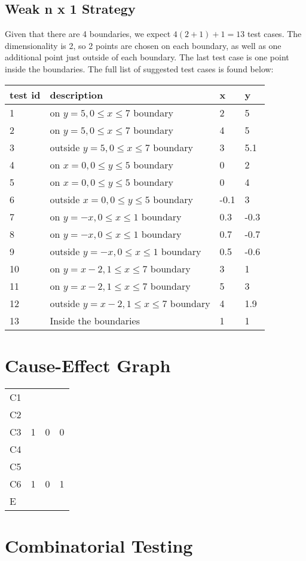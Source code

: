 \documentclass[letterpaper]{article}
\begin{document}
\subsection{Weak n x 1 Strategy}
Given that there are 4 boundaries, we expect $4(2+1) +1 = 13$ test cases. 
The dimensionality is 2, so 2 points are chosen on each boundary, as well
as one additional point just outside of each boundary. The last test case
is one point inside the boundaries. The full list of suggested test cases
is found below: 
\begin{adjustbox}{center}
	\begin{tabular}{llll}
		test id & description 			        & x & y    \\ \hline
		1       & on $y=5, 0\leq x\leq 7$ boundary      & 2 & 5    \\
		2       & on $y=5, 0\leq x\leq 7$ boundary      & 4 & 5    \\
		3       & outside $y=5, 0\leq x\leq 7$ boundary & 3 & 5.1 \\
		4 & on $x=0, 0\leq y \leq 5$ boundary           & 0 & 2 \\
		5 & on $x=0, 0\leq y \leq 5$ boundary           & 0 & 4 \\
		6 & outside $x=0, 0\leq y \leq 5$ boundary      & -0.1 & 3 \\
		7 & on $y=-x, 0\leq x\leq 1$ boundary           & 0.3 & -0.3 \\
		8 & on $y=-x, 0\leq x\leq 1$ boundary           & 0.7 & -0.7 \\
		9 & outside  $y=-x, 0\leq x\leq 1$ boundary      & 0.5 & -0.6 \\
		10 & on $y=x-2, 1\leq x \leq 7$ boundary        & 3 & 1 \\
		11 & on $y=x-2, 1\leq x \leq 7$ boundary        & 5 & 3 \\
		12 & outside $y=x-2, 1\leq x \leq 7$ boundary   & 4 & 1.9 \\
		13 & Inside the boundaries                      & 1 & 1 \\


                                                      
                                                      
                                                    
\end{tabular}
\end{adjustbox}
\section{Cause-Effect Graph}
\begin{adjustbox}{center}
	\begin{tabular}{llll}
C1 &   &   &   \\
C2 &   &   &   \\
C3 & 1 & 0 & 0 \\
C4 &   &   &   \\
C5 &   &   &   \\
C6 & 1 & 0 & 1 \\ \cline{1-1}
E  &   &   &  
\end{tabular}
\end{adjustbox}
\section{Combinatorial Testing}
\end{document}
